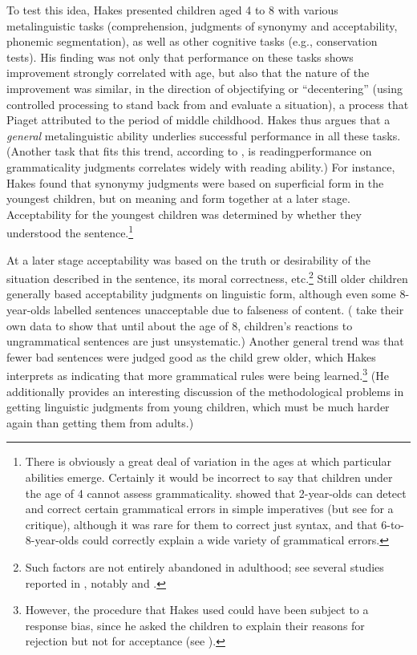 To test this idea, Hakes presented children aged 4 to 8 with various metalinguistic tasks (comprehension, judgments of synonymy and acceptability, phonemic segmentation), as well as other cognitive tasks (e.g., conservation tests). His finding was not only that performance on these tasks shows improvement strongly correlated with age, but also that the nature of the improvement was similar, in the direction of objectifying or ``decentering'' (using controlled processing to stand back from and evaluate a situation), a process that Piaget attributed to the period of middle childhood. Hakes thus argues that a \textit{general} metalinguistic ability underlies successful performance in all these tasks. (Another task that fits this trend, according to \citet{RyanEtAl1984}, is reading\schdash{}performance on grammaticality
judgments correlates widely with reading ability.) For instance, Hakes found that synonymy judgments were based on superficial form in the youngest children, but on meaning and form together at a later stage. Acceptability for the youngest children was determined by whether they understood the sentence.\footnote{There is obviously a great deal of variation in the ages at which particular abilities emerge. Certainly it would be incorrect to say that children under the age of 4 cannot assess grammaticality. \citet{GleitmanEtAl1972} showed that 2\textonehalf-year-olds can detect and correct certain grammatical errors in simple imperatives (but see \citet{Gombert1992} for a critique), although it was rare for them to correct just syntax, and that 6-to-8-year-olds could correctly explain a wide variety of grammatical errors.}

 At a later stage acceptability was based on the truth or desirability of the situation described in the sentence, its moral correctness, etc.\footnote{Such factors are not entirely abandoned in adulthood; see several studies reported in , notably \citet{Hill1961} and \citet{VetterEtAl1979}.}
 Still older children generally based acceptability judgments on linguistic form, although even some 8-year-olds labelled sentences unacceptable due to falseness of  content. (\citet{RyanEtAl1984} take their own data to show that until about the age of 8, children's reactions to ungrammatical sentences are just unsystematic.) Another general trend was  that fewer bad sentences were judged good as the child grew older, which Hakes interprets as indicating that more grammatical rules were being learned.\footnote{However, the procedure that Hakes used could have been subject to a response bias, since he asked the children to explain their reasons for rejection but not for acceptance (see ).}
(He additionally provides an interesting discussion of the methodological problems in getting linguistic judgments from young children, which must be much harder again than getting them from adults.)

